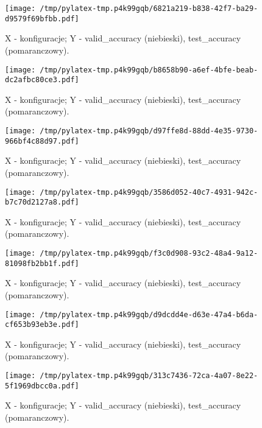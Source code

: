 \documentclass{article}%
\begin{document}
%
\newpage%


\begin{figure}[h]%
\centering%
\texttt{[image: /tmp/pylatex-tmp.p4k99gqb/6821a219-b838-42f7-ba29-d9579f69bfbb.pdf]}%
\caption{X {-} konfiguracje; Y {-} valid\_accuracy (niebieski), test\_accuracy (pomaranczowy).}%
\end{figure}

%
\newpage%


\begin{figure}[h]%
\centering%
\texttt{[image: /tmp/pylatex-tmp.p4k99gqb/b8658b90-a6ef-4bfe-beab-dc2afbc80ce3.pdf]}%
\caption{X {-} konfiguracje; Y {-} valid\_accuracy (niebieski), test\_accuracy (pomaranczowy).}%
\end{figure}

%
\newpage%


\begin{figure}[h]%
\centering%
\texttt{[image: /tmp/pylatex-tmp.p4k99gqb/d97ffe8d-88dd-4e35-9730-966bf4c88d97.pdf]}%
\caption{X {-} konfiguracje; Y {-} valid\_accuracy (niebieski), test\_accuracy (pomaranczowy).}%
\end{figure}

%
\newpage%


\begin{figure}[h]%
\centering%
\texttt{[image: /tmp/pylatex-tmp.p4k99gqb/3586d052-40c7-4931-942c-b7c70d2127a8.pdf]}%
\caption{X {-} konfiguracje; Y {-} valid\_accuracy (niebieski), test\_accuracy (pomaranczowy).}%
\end{figure}

%
\newpage%


\begin{figure}[h]%
\centering%
\texttt{[image: /tmp/pylatex-tmp.p4k99gqb/f3c0d908-93c2-48a4-9a12-81098fb2bb1f.pdf]}%
\caption{X {-} konfiguracje; Y {-} valid\_accuracy (niebieski), test\_accuracy (pomaranczowy).}%
\end{figure}

%
\newpage%


\begin{figure}[h]%
\centering%
\texttt{[image: /tmp/pylatex-tmp.p4k99gqb/d9dcdd4e-d63e-47a4-b6da-cf653b93eb3e.pdf]}%
\caption{X {-} konfiguracje; Y {-} valid\_accuracy (niebieski), test\_accuracy (pomaranczowy).}%
\end{figure}

%
\newpage%


\begin{figure}[h]%
\centering%
\texttt{[image: /tmp/pylatex-tmp.p4k99gqb/313c7436-72ca-4a07-8e22-5f1969dbcc0a.pdf]}%
\caption{X {-} konfiguracje; Y {-} valid\_accuracy (niebieski), test\_accuracy (pomaranczowy).}%
\end{figure}
\end{document}
